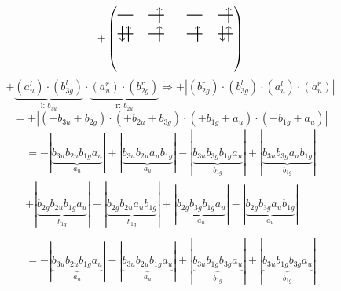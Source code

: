\documentclass{article}
\begin{document}
\vspace{0.5cm}

\[+\left(\begin{tikzpicture}
    \draw[thick] (0,0) -- (0.5,0); %
    \draw[thick] (1,0) -- (1.5,0); %
    \draw[thick] (0,-0.6) -- (0.5,-0.6); %
    \draw[thick] (1,-0.6) -- (1.5,-0.6); %
\draw[->, thick] (1.35, -0.25) -- (1.35, 0.25); 
\draw[-> , thick] (0.35, -0.85) -- (0.35, -0.35); 
\draw[<- , thick] (0.15, -0.85) -- (0.15, -0.35); 
 \draw[-> , thick] (1.35, -0.85) -- (1.35, -0.35); 
\end{tikzpicture}\qquad \begin{tikzpicture}
    \draw[thick] (0,0) -- (0.5,0); %
    \draw[thick] (1,0) -- (1.5,0); %
    \draw[thick] (0,-0.6) -- (0.5,-0.6); %
    \draw[thick] (1,-0.6) -- (1.5,-0.6); %
\draw[->, thick] (1.35, -0.25) -- (1.35, 0.25); 
\draw[-> , thick] (0.35, -0.85) -- (0.35, -0.35); 
 \draw[-> , thick] (1.35, -0.85) -- (1.35, -0.35); 
\draw[<- , thick] (1.15, -0.85) -- (1.15, -0.35); 
\end{tikzpicture}\right)\]$$+ \underbrace{(a_{u}^{l})\cdot (b_{3g}^{l})}_{\text{l: }b_{3u}}\cdot \underbrace{(a_{u}^{r})\cdot (b_{2g}^{r})}_{\text{r: }b_{2u}}\Rightarrow +\left|(b_{2g}^{r}) \cdot (b_{3g}^{l}) \cdot (a_{u}^{l}) \cdot (a_{u}^{r})\right|$$$$=+\left|(-b_{3u}+b_{2g}) \cdot (+b_{2u}+b_{3g}) \cdot (+b_{1g}+a_{u}) \cdot (-b_{1g}+a_{u})\right|$$\begin{multline*}
=-\left|\underbrace{b_{3u} b_{2u} b_{1g} a_{u}}_{a_{u}}\right|+\left|\underbrace{b_{3u} b_{2u} a_{u} b_{1g}}_{a_{u}}\right|-\left|\underbrace{b_{3u} b_{3g} b_{1g} a_{u}}_{b_{1g}}\right|+\left|\underbrace{b_{3u} b_{3g} a_{u} b_{1g}}_{b_{1g}}\right|\\
+\left|\underbrace{b_{2g} b_{2u} b_{1g} a_{u}}_{b_{1g}}\right|-\left|\underbrace{b_{2g} b_{2u} a_{u} b_{1g}}_{b_{1g}}\right|+\left|\underbrace{b_{2g} b_{3g} b_{1g} a_{u}}_{a_{u}}\right|-\left|\underbrace{b_{2g} b_{3g} a_{u} b_{1g}}_{a_{u}}\right|\\
\end{multline*}\begin{multline*}
=-\left|\underbrace{b_{3u} b_{2u} b_{1g} a_{u}}_{a_{u}}\right|-\left|\underbrace{b_{3u} b_{2u} b_{1g} a_{u}}_{a_{u}}\right|+\left|\underbrace{b_{3u} b_{1g} b_{3g} a_{u}}_{b_{1g}}\right|+\left|\underbrace{b_{3u} b_{1g} b_{3g} a_{u}}_{b_{1g}}\right|\\

\end{multline*}
\end{document}
